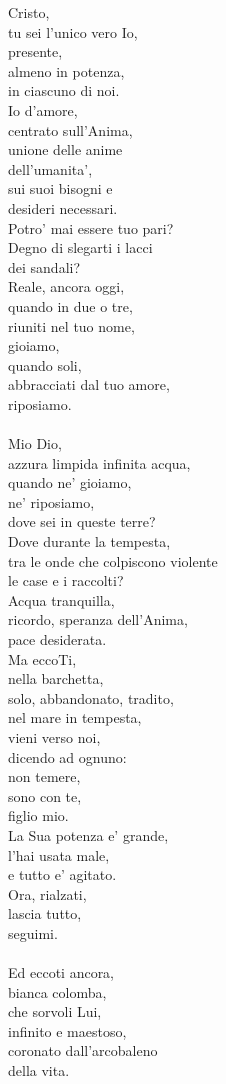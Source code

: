 \begin{haiku}
Cristo,\\
tu sei l’unico vero Io,\\
presente,\\
    almeno in potenza,\\
    in ciascuno di noi.\\
Io d'amore,\\
    centrato sull’Anima,\\
unione delle anime\\
dell’umanita’,\\
sui suoi bisogni e\\
desideri necessari.\\
Potro' mai essere tuo pari?\\
Degno di slegarti i lacci\\
    dei sandali?\\
Reale, ancora oggi,\\
quando in due o tre,\\
riuniti nel tuo nome,\\
gioiamo,\\
quando soli,\\
abbracciati dal tuo amore,\\
riposiamo.\\
\leavevmode\\
Mio Dio,\\
azzura limpida infinita acqua,\\
quando ne' gioiamo,\\
ne' riposiamo,\\
dove sei in queste terre?\\
Dove durante la tempesta,\\
tra le onde che colpiscono violente\\
le case e i raccolti?\\
Acqua tranquilla,\\
ricordo, speranza dell'Anima,\\
pace desiderata.\\
Ma eccoTi,\\
nella barchetta,\\
solo, abbandonato, tradito,\\
nel mare in tempesta,\\
vieni verso noi,\\
dicendo ad ognuno:\\
non temere,\\
sono con te,\\
figlio mio.\\
La Sua potenza e' grande,\\
l'hai usata male,\\
e tutto e' agitato.\\
Ora, rialzati,\\
lascia tutto,\\
seguimi.\\
\leavevmode\\
Ed eccoti ancora,\\
bianca colomba,\\
che sorvoli Lui,\\
infinito e maestoso,\\
coronato dall'arcobaleno\\
della vita.\\
\end{haiku}
